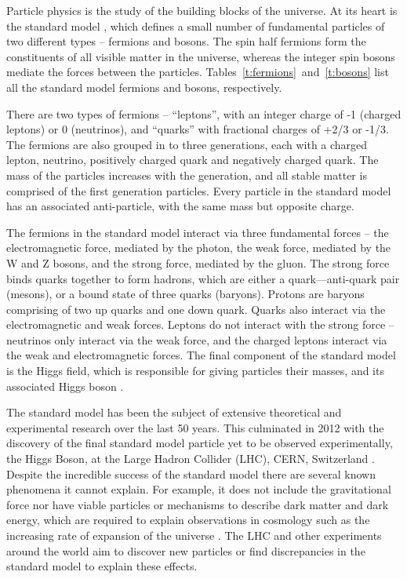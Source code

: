 

Particle physics is the study of the building blocks of the universe. At its heart is the standard model \cite{standMod}, which defines a small number of fundamental particles of two different types -- fermions and bosons. The spin half fermions form the constituents of all visible matter in the universe, whereas the integer spin bosons mediate the forces between the particles.  Tables~\ref{t:fermions}~and~\ref{t:bosons} list all the standard model fermions and bosons, respectively. 

There are two types of fermions -- ``leptons'', with an integer charge of -1 (charged leptons) or 0 (neutrinos), and ``quarks'' with fractional charges of +2/3 or -1/3. 
The fermions are also grouped in to three generations, each with a charged lepton, neutrino, positively charged quark and negatively charged quark. 
The mass of the particles increases with the generation, and all stable matter is comprised of the first generation particles. Every particle in the standard model has an associated anti-particle, with the same mass but opposite charge. 

The fermions in the standard model interact via three fundamental forces -- the electromagnetic force, mediated by the photon, the weak force, mediated by the W and Z bosons, and the strong force, mediated by the gluon. The strong force binds quarks together to form hadrons, which are either a quark---anti-quark pair (mesons), or a bound state of three quarks (baryons). Protons are baryons comprising of two up quarks and one down quark. Quarks also interact via the electromagnetic and weak forces. Leptons do not interact with the strong force -- neutrinos only interact via the weak force, and the charged leptons interact via the weak and electromagnetic forces. The final component of the standard model is the Higgs field,  which is responsible for giving particles their masses, and its associated Higgs boson \cite{higgsPap}.

The standard model has been the subject of extensive theoretical and experimental research over the last 50 years. This culminated in 2012 with the discovery of the final standard model particle yet to be observed experimentally, the Higgs Boson, at the Large Hadron Collider (LHC), CERN, Switzerland \cite{higgsATLAS,higgsCMS}. Despite the incredible success of the standard model there are several known phenomena it cannot explain. For example, it does not include the gravitational force nor have viable particles or mechanisms to describe dark matter and dark energy, which are required to explain observations in cosmology such as the increasing rate of expansion of the universe \cite{darkEn}. The LHC and other experiments around the world aim to discover new particles or find discrepancies in the standard model to explain these effects.

